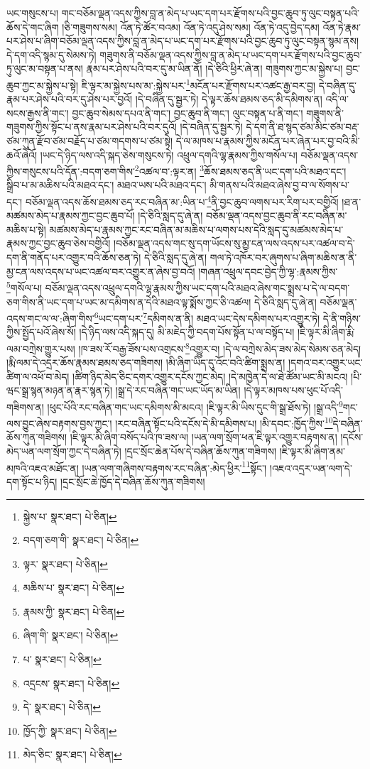 ཡང་གསུངས་པ། གང་བཅོམ་ལྡན་འདས་ཀྱིས་བླ་ན་མེད་པ་ཡང་དག་པར་རྫོགས་པའི་བྱང་ཆུབ་ཏུ་ལུང་བསྟན་པའི་ཆོས་དེ་གང་ཞིག །ཅི་གཟུགས་སམ། འོན་ཏེ་ཚོར་བའམ། འོན་ཏེ་འདུ་ཤེས་སམ། འོན་ཏེ་འདུ་བྱེད་དམ། འོན་ཏེ་རྣམ་པར་ཤེས་པ་ཞིག་བཅོམ་ལྡན་འདས་ཀྱིས་བླ་ན་མེད་པ་ཡང་དག་པར་རྫོགས་པའི་བྱང་ཆུབ་ཏུ་ལུང་བསྟན་སྙམ་ནས། དེ་དག་འདི་སྙམ་དུ་སེམས་ཏེ། གཟུགས་ནི་བཅོམ་ལྡན་འདས་ཀྱིས་བླ་ན་མེད་པ་ཡང་དག་པར་རྫོགས་པའི་བྱང་ཆུབ་ཏུ་ལུང་མ་བསྟན་པ་ནས། རྣམ་པར་ཤེས་པའི་བར་དུ་མ་ཡིན་ནོ། །དེ་ཅིའི་ཕྱིར་ཞེ་ན། གཟུགས་ཀྱང་མ་སྐྱེས་པ། བྱང་ཆུབ་ཀྱང་མ་སྐྱེས་པ་སྟེ། ཇི་ལྟར་མ་སྐྱེས་པས་མ་:སྐྱེས་པར་\footnote{སྐྱེས་པ་  སྣར་ཐང་།  པེ་ཅིན། }མངོན་པར་རྫོགས་པར་འཚང་རྒྱ་བར་བྱ། དེ་བཞིན་དུ་རྣམ་པར་ཤེས་པའི་བར་དུ་ཤེས་པར་བྱའོ། །དེ་བཞིན་དུ་སྦྱར་ཏེ། དེ་ལྟར་ཆོས་ཐམས་ཅད་མི་དམིགས་ན། འདི་ལ་སངས་རྒྱས་ནི་གང་། བྱང་ཆུབ་སེམས་དཔའ་ནི་གང་། བྱང་ཆུབ་ནི་གང་། ལུང་བསྟན་པ་ནི་གང་། གཟུགས་ནི་གཟུགས་ཀྱིས་སྟོང་པ་ནས་རྣམ་པར་ཤེས་པའི་བར་དུའོ། །དེ་བཞིན་དུ་སྦྱར་ཏེ། དེ་དག་ནི་ཐ་སྙད་ཙམ་མིང་ཙམ་བརྡ་ཙམ་ཀུན་རྫོབ་ཙམ་བརྗོད་པ་ཙམ་གདགས་པ་ཙམ་སྟེ། དེ་ལ་མཁས་པ་རྣམས་ཀྱིས་མངོན་པར་ཞེན་པར་བྱ་བའི་མི་ཆའོ་ཞེའོ། །ཡང་དེ་ཉིད་ལས་འདི་སྐད་ཅེས་གསུངས་ཏེ། འཕྲུལ་དགའི་ལྷ་རྣམས་ཀྱིས་གསོལ་པ། བཅོམ་ལྡན་འདས་ཀྱིས་གསུངས་པའི་དོན་:བདག་ཅག་གིས་\footnote{བདག་ཅག་གི་  སྣར་ཐང་།  པེ་ཅིན། }འཚལ་བ་:ལྟར་ན། \footnote{ལྟར་  སྣར་ཐང་།  པེ་ཅིན། }ཆོས་ཐམས་ཅད་ནི་ཡང་དག་པའི་མཐའ་དང་། སྒྲིབ་པ་མ་མཆིས་པའི་མཐའ་དང་། མཐའ་ཡས་པའི་མཐའ་དང་། མི་གནས་པའི་མཐའ་ཞེས་བྱ་བ་ལ་སོགས་པ་དང་། བཅོམ་ལྡན་འདས་ཆོས་ཐམས་ཅད་རང་བཞིན་མ་:ཡིན་པ་\footnote{མཆིས་པ་  སྣར་ཐང་།  པེ་ཅིན། }ནི་བྱང་ཆུབ་ལགས་པར་རིག་པར་བགྱིའོ། །ཐ་ན་མཚམས་མེད་པ་རྣམས་ཀྱང་བྱང་ཆུབ་པོ། །དེ་ཅིའི་སླད་དུ་ཞེ་ན། བཅོམ་ལྡན་འདས་བྱང་ཆུབ་ནི་རང་བཞིན་མ་མཆིས་པ་སྟེ། མཚམས་མེད་པ་རྣམས་ཀྱང་རང་བཞིན་མ་མཆིས་པ་ལགས་པས་དེའི་སླད་དུ་མཚམས་མེད་པ་རྣམས་ཀྱང་བྱང་ཆུབ་ཅེས་བགྱིའོ། །བཅོམ་ལྡན་འདས་གང་སུ་དག་ཡོངས་སུ་མྱ་ངན་ལས་འདས་པར་འཚལ་བ་དེ་དག་ནི་གནོད་པར་འགྱུར་བའི་ཆོས་ཅན་ཏེ། དེ་ཅིའི་སླད་དུ་ཞེ་ན། གལ་ཏེ་འཁོར་བར་ཞུགས་པ་ཞིག་མཆིས་ན་ནི་མྱ་ངན་ལས་འདས་པ་ཡང་འཚལ་བར་འགྱུར་ན་ཞེས་བྱ་བའོ། །གཞན་འཕྲུལ་དབང་བྱེད་ཀྱི་ལྷ་:རྣམས་ཀྱིས་\footnote{རྣམས་ཀྱི་  སྣར་ཐང་།  པེ་ཅིན། }གསོལ་པ། བཅོམ་ལྡན་འདས་འཕྲུལ་དགའི་ལྷ་རྣམས་ཀྱིས་ཡང་དག་པའི་མཐའ་ཞེས་གང་སྨྲས་པ་དེ་ལ་བདག་ཅག་གིས་ནི་ཡང་དག་པ་ཡང་མ་དམིགས་ན་དེའི་མཐའ་ལྟ་སྨོས་ཀྱང་ཅི་འཚལ། དེ་ཅིའི་སླད་དུ་ཞེ་ན། བཅོམ་ལྡན་འདས་གང་ལ་ལ་:ཞིག་གིས་\footnote{ཞིག་གི་  སྣར་ཐང་།  པེ་ཅིན། }ཡང་དག་པར་\footnote{པ་  སྣར་ཐང་།  པེ་ཅིན། }དམིགས་ན་ནི། མཐའ་ཡང་དེས་དམིགས་པར་འགྱུར་ཏེ། དེ་ནི་གཉིས་ཀྱིས་སྤྱོད་པའོ་ཞེས་སོ། །དེ་ཉིད་ལས་འདི་སྐད་དུ། མི་མཇེད་ཀྱི་བདག་པོས་སྟོན་པ་ལ་བསྟོད་པ། །ཇི་ལྟར་མི་ཞིག་རྨི་ལམ་བཀྲེས་གྱུར་པས། །ཁ་ཟས་རོ་བརྒྱ་ཟོས་པས་འགྲངས་\footnote{འདྲངས་  སྣར་ཐང་།  པེ་ཅིན། }འགྱུར་བ། །དེ་ལ་བཀྲེས་མེད་ཟས་མེད་སེམས་ཅན་མེད། །རྨི་ལམ་དེ་འདྲར་ཆོས་རྣམས་ཐམས་ཅད་གཟིགས། །མི་ཞིག་ཡིད་དུ་འོང་བའི་ཚིག་སྨྲས་ན། །དགའ་བར་འགྱུར་ཡང་ཚིག་ལ་འཕོ་བ་མེད། །ཚིག་ཉིད་མེད་ཅིང་དགར་འགྱུར་དངོས་ཀྱང་མེད། །དེ་མཁྱེན་དེ་ལ་ཐེ་ཚོམ་ཡང་མི་མངའ། །པི་ཝང་སྒྲ་སྙན་མཉན་ན་རྣར་སྙན་ཏེ། །སྒྲ་དེ་རང་བཞིན་གང་ཡང་ཡོད་མ་ཡིན། །དེ་ལྟར་མཁས་པས་ཕུང་པོ་འདི་གཟིགས་ན། །ཕུང་པོའི་རང་བཞིན་གང་ཡང་དམིགས་མི་མངའ། །ཇི་ལྟར་མི་ཡིས་དུང་གི་སྒྲ་ཐོས་ཏེ། །སྒྲ་འདི་\footnote{དེ་  སྣར་ཐང་།  པེ་ཅིན། }གང་ལས་བྱུང་ཞེས་བརྟགས་བྱས་ཀྱང་། །རང་བཞིན་སྟོང་པའི་དངོས་དེ་མི་དམིགས་པ། །མི་དབང་:ཁྱོད་ཀྱིས་\footnote{ཁྱོད་ཀྱི་  སྣར་ཐང་།  པེ་ཅིན། }དེ་བཞིན་ཆོས་ཀུན་གཟིགས། །ཇི་ལྟར་མི་ཞིག་བསོད་པའི་ཁ་ཟས་ལ། །ཡན་ལག་སྲོག་ཕན་ཇི་ལྟར་འགྱུར་བརྟགས་ན། །དངོས་མེད་ཡན་ལག་སྲོག་ཀྱང་དེ་བཞིན་ཏེ། །དྲང་སྲོང་ཆེན་པོས་དེ་བཞིན་ཆོས་ཀུན་གཟིགས། །ཇི་ལྟར་མི་ཞིག་ནམ་མཁའི་འཇའ་མཐོང་ན། །ཡན་ལག་གཞིགས་བརྟགས་རང་བཞིན་:མེད་ཕྱིར་\footnote{མེད་ཅིང་  སྣར་ཐང་།  པེ་ཅིན། }སྟོང་། །འཇའ་འདྲར་ཡན་ལག་དེ་དག་སྟོང་པ་ཉིད། །དྲང་སྲོང་ཆེ་ཁྱོད་དེ་བཞིན་ཆོས་ཀུན་གཟིགས། 